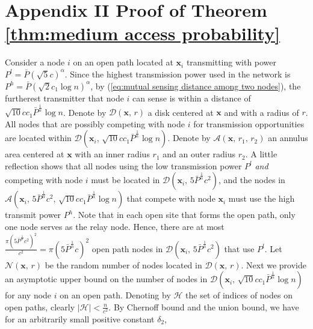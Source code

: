 \documentclass[english]{IEEEtran}
\theoremstyle{plain}
\theoremstyle{plain}
\theoremstyle{plain}
\theoremstyle{remark}
\begin{document}
\section*{Appendix II Proof of Theorem \ref{thm:medium access probability}}

Consider a node $i$ on an open path located at $\boldsymbol{x}_{i}$
transmitting with power $P^{l}=\bar{P}\left(\sqrt{5}c\right)^{\alpha}$.
Since the highest transmission power used in the network is $P^{h}=\bar{P}\left(\sqrt{2}c_{1}\log n\right)^{\alpha}$,
by (\ref{eq:mutual sensing distance among two nodes}), the furtherest
transmitter that node $i$ can sense is within a distance of $\sqrt{10}cc_{1}\bar{P}^{\frac{1}{\alpha}}\log n$.
Denote by $\mathcal{D}\left(\boldsymbol{x},\, r\right)$ a disk centered
at $\boldsymbol{x}$ and with a radius of $r$. All nodes that are
possibly competing with node $i$ for transmission opportunities are
located within $\mathcal{D}\left(\boldsymbol{x}_{i},\,\sqrt{10}cc_{1}\bar{P}^{\frac{1}{\alpha}}\log n\right)$.
Denote by $\mathcal{A}\left(\boldsymbol{x},\, r_{1},\, r_{2}\right)$
an annulus area centered at $\boldsymbol{x}$ with an inner radius
$r_{1}$ and an outer radius $r_{2}$. A little reflection shows that
all nodes using the low transmission power $P^{l}$ \emph{and} competing
with node $i$ must be located in $\mathcal{D}\left(\boldsymbol{x}_{i},\,5\bar{P}^{\frac{1}{\alpha}}c^{2}\right)$,
and the nodes in $\mathcal{A}\left(\boldsymbol{x}_{i},\,5\bar{P}^{\frac{1}{\alpha}}c^{2},\,\sqrt{10}cc_{1}\bar{P}^{\frac{1}{\alpha}}\log n\right)$
that compete with node $\boldsymbol{x}_{i}$ must use the high transmit
power $P^{h}$. Note that in each open site that forms the open path,
only one node serves as the relay node. Hence, there are at most $\frac{\pi\left(5\bar{P}^{\frac{1}{\alpha}}c^{2}\right)^{2}}{c^{2}}=\pi\left(5\bar{P}^{\frac{1}{\alpha}}c\right)^{2}$
open path nodes in $\mathcal{D}\left(\boldsymbol{x}_{i},\,5\bar{P}^{\frac{1}{\alpha}}c^{2}\right)$
that use $P^{l}$. Let $\mathcal{N}\left(\boldsymbol{x},\, r\right)$
be the random number of nodes located in $\mathcal{D}\left(\boldsymbol{x},\, r\right)$.
Next we provide an asymptotic upper bound on the number of  nodes
in $\mathcal{D}\left(\boldsymbol{x}_{i},\,\sqrt{10}cc_{1}\bar{P}^{\frac{1}{\alpha}}\log n\right)$
for any node $i$ on an open path. Denoting by $\mathcal{H}$ the
set of indices of nodes on open paths, clearly $\left|\mathcal{H}\right|<\frac{n}{c^{2}}$.
By Chernoff bound and the union bound, we have for an arbitrarily
small positive constant $\delta_{2}$,
\end{document}
